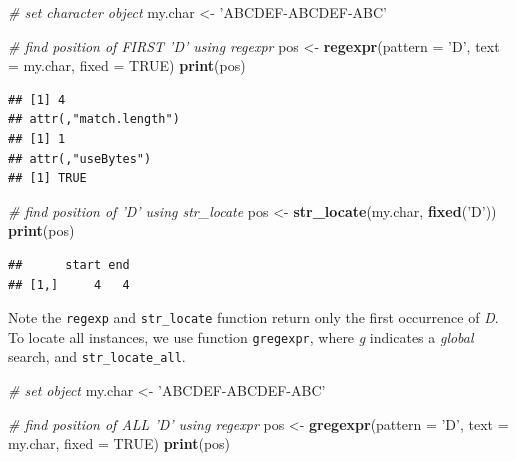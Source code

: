 \documentclass[11pt,]{book}
\newenvironment{Shaded}{\begin{snugshade}}{\end{snugshade}}
\newcommand{\KeywordTok}[1]{\textcolor[rgb]{0.27,0.27,0.27}{\textbf{#1}}}
\newcommand{\DataTypeTok}[1]{\textcolor[rgb]{0.27,0.27,0.27}{#1}}
\newcommand{\StringTok}[1]{\textcolor[rgb]{0.5,0.5,0.5}{#1}}
\newcommand{\CommentTok}[1]{\textcolor[rgb]{0.56,0.35,0.01}{\textit{#1}}}
\newcommand{\OtherTok}[1]{\textcolor[rgb]{0.56,0.35,0.01}{#1}}
\newcommand{\NormalTok}[1]{#1}
\begin{document}
\begin{Shaded}
\begin{Highlighting}[]
\CommentTok{# set character object}
\NormalTok{my.char <-}\StringTok{ 'ABCDEF-ABCDEF-ABC'}

\CommentTok{# find position of FIRST 'D' using regexpr}
\NormalTok{pos <-}\StringTok{ }\KeywordTok{regexpr}\NormalTok{(}\DataTypeTok{pattern =} \StringTok{'D'}\NormalTok{, }\DataTypeTok{text =}\NormalTok{ my.char, }\DataTypeTok{fixed =} \OtherTok{TRUE}\NormalTok{) }
\KeywordTok{print}\NormalTok{(pos)}
\end{Highlighting}
\end{Shaded}

\begin{verbatim}
## [1] 4
## attr(,"match.length")
## [1] 1
## attr(,"useBytes")
## [1] TRUE
\end{verbatim}

\begin{Shaded}
\begin{Highlighting}[]
\CommentTok{# find position of 'D' using str_locate}
\NormalTok{pos <-}\StringTok{ }\KeywordTok{str_locate}\NormalTok{(my.char, }\KeywordTok{fixed}\NormalTok{(}\StringTok{'D'}\NormalTok{))}
\KeywordTok{print}\NormalTok{(pos)}
\end{Highlighting}
\end{Shaded}

\begin{verbatim}
##      start end
## [1,]     4   4
\end{verbatim}

Note the \texttt{regexp} and \texttt{str\_locate} function return only
the first occurrence of \emph{D}. To locate all instances, we use
function \texttt{gregexpr}, where \emph{g} indicates a \emph{global}
search, and \texttt{str\_locate\_all}.

\begin{Shaded}
\begin{Highlighting}[]
\CommentTok{# set object}
\NormalTok{my.char <-}\StringTok{ 'ABCDEF-ABCDEF-ABC'}

\CommentTok{# find position of ALL 'D' using regexpr}
\NormalTok{pos <-}\StringTok{ }\KeywordTok{gregexpr}\NormalTok{(}\DataTypeTok{pattern =} \StringTok{'D'}\NormalTok{, }\DataTypeTok{text =}\NormalTok{ my.char, }\DataTypeTok{fixed =} \OtherTok{TRUE}\NormalTok{) }
\KeywordTok{print}\NormalTok{(pos)}
\end{Highlighting}
\end{Shaded}
\end{document}
